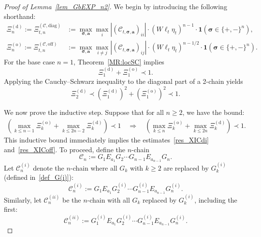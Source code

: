 \documentclass[10pt,reqno]{article}
\theoremstyle{plain} %
\theoremstyle{remark}
\numberwithin{equation}{section}
\begin{document}
\begin{proof}[Proof of Lemma~\ref{lem_GbEXP_n2}]
We begin by introducing the following shorthand:
\begin{align}
\Xi_n^{(\mathrm{d})} := \Xi_{t,n}^{(\mathcal{C}, \mathrm{diag})} 
&:= \max_{\boldsymbol{\sigma}, \mathbf{a}} \max_i \left| \left( \mathcal{C}_{t, \boldsymbol{\sigma}, \mathbf{a}} \right)_{ii} \right| 
\cdot (W \ell_t \eta_t)^{n-1} \cdot \mathbf{1}\left( \boldsymbol{\sigma} \in \{+, -\}^n \right), \\
\Xi_n^{(\mathrm{o})} := \Xi_{t,n}^{(\mathcal{C}, \mathrm{off})} 
&:= \max_{\boldsymbol{\sigma}, \mathbf{a}} \max_{i \ne j} \left| \left( \mathcal{C}_{t, \boldsymbol{\sigma}, \mathbf{a}} \right)_{ij} \right| 
\cdot (W \ell_t \eta_t)^{n - 1/2} \cdot \mathbf{1}\left( \boldsymbol{\sigma} \in \{+, -\}^n \right).
\end{align}
For the base case \( n = 1 \), Theorem~\ref{MR:locSC} implies
\[
\Xi_1^{(\mathrm{d})} + \Xi_1^{(\mathrm{o})} \prec 1.
\]
Applying the Cauchy–Schwarz inequality to the diagonal part of a 2-chain yields
\[
\Xi_2^{(\mathrm{d})} \prec \left( \Xi_1^{(\mathrm{d})} \right)^2 + \left( \Xi_1^{(\mathrm{o})} \right)^2 \prec 1.
\]

We now prove the inductive step. Suppose that for all \( n \ge 2 \), we have the bound:
\begin{align}\label{aspchain}
\left( \max_{k \le n - 1} \Xi_k^{(\mathrm{o})} + \max_{k \le 2n - 2} \Xi_k^{(\mathrm{d})} \right) \prec 1 
\quad \Longrightarrow \quad 
\left( \max_{k \le n} \Xi_k^{(\mathrm{o})} + \max_{k \le 2n} \Xi_k^{(\mathrm{d})} \right) \prec 1.
\end{align}
This inductive bound immediately implies the estimates~\eqref{res_XICdi} and~\eqref{res_XICoff}.
To proceed, define the $n$-chain
\begin{equation}\label{defSPChain}
\mathcal{C}_n := G_1 E_{a_1} G_2 \cdots G_{n-1} E_{a_{n-1}} G_n.
\end{equation}
Let \( \mathcal{C}_n^{(i)} \) denote the $n$-chain where all \( G_k \) with \( k \ge 2 \) are replaced by \( G_k^{(i)} \) (defined in~\eqref{def_G(i)}):
\begin{equation}\label{defCn_i}
\mathcal{C}_n^{(i)} := G_1 E_{a_1} G^{(i)}_2 \cdots G^{(i)}_{n-1} E_{a_{n-1}} G^{(i)}_n.
\end{equation}
Similarly, let \( \mathcal{C}_n^{(ii)} \) be the $n$-chain with all \( G_k \) replaced by \( G_k^{(i)} \), including the first:
\begin{equation}\label{defCn_ii}
\mathcal{C}_n^{(ii)} := G^{(i)}_1 E_{a_1} G^{(i)}_2 \cdots G^{(i)}_{n-1} E_{a_{n-1}} G^{(i)}_n.
\end{equation}


\end{proof}
\end{document}
